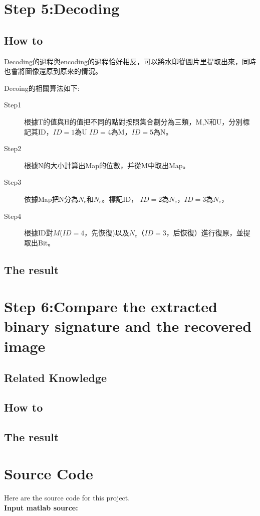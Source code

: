 \documentclass[a4paper,12pt]{article}%
\begin{document}
\section{Step 5:Decoding}   
    \subsection{How to}
Decoding的過程與encoding的過程恰好相反，可以將水印從圖片里提取出來，同時也會將圖像還原到原來的情況。
        
    Decoing的相關算法如下:
\begin{description}
      \item[Step1]根據T的值與H的值把不同的點對按照集合劃分為三類，M,N和U，分別標記其ID，$ID=1$為U
$ID=4$為M，$ID=5$為N。
      \item[Step2]根據N的大小計算出Map的位數，并從M中取出Map。
      \item[Step3]依據Map把N分為$N_e$和$N_{\bar{e}}$。標記ID，
$ID=2$為$N_{\bar{e}}$，$ID=3$為$N_e$，
      \item[Step4]根據ID對$M$($ID=4$，先恢復)以及$N_e$（$ID=3$，后恢復）進行復原，並提取出Bit。
\end{description}
\subsection{The result}
    
    
\section{Step 6:Compare the extracted binary signature and the recovered image}
    \subsection{Related Knowledge}
    \subsection{How to}
    \subsection{The result}
\section{Source Code}
Here are the source code for this project.\\

\textbf{\textcolor[rgb]{0.98,0.00,0.00}{Input matlab source:}}

\end{document}
